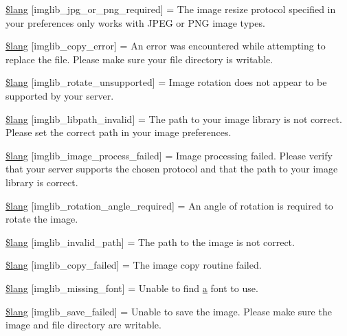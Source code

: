 \begin{DoxyCompactItemize}
\item 
\hyperlink{imglib__lang_8php_a2878e2b878871cd8010970f865d70e71}{\$lang} \mbox{[}\textquotesingle{}imglib\+\_\+jpg\+\_\+or\+\_\+png\+\_\+required\textquotesingle{}\mbox{]} = \textquotesingle{}The image resize protocol specified in your preferences only works with J\+P\+E\+G or P\+N\+G image types.\textquotesingle{}
\item 
\hyperlink{imglib__lang_8php_a012b6a0d2b3a8ef934e8783d2fbd6535}{\$lang} \mbox{[}\textquotesingle{}imglib\+\_\+copy\+\_\+error\textquotesingle{}\mbox{]} = \textquotesingle{}An error was encountered while attempting to replace the file. Please make sure your file directory is writable.\textquotesingle{}
\item 
\hyperlink{imglib__lang_8php_ab1c77c6b58fc5bf8e979ab4237ec87e7}{\$lang} \mbox{[}\textquotesingle{}imglib\+\_\+rotate\+\_\+unsupported\textquotesingle{}\mbox{]} = \textquotesingle{}Image rotation does not appear to be supported by your server.\textquotesingle{}
\item 
\hyperlink{imglib__lang_8php_a8f190c17a02ca89334c8bf0a04333f65}{\$lang} \mbox{[}\textquotesingle{}imglib\+\_\+libpath\+\_\+invalid\textquotesingle{}\mbox{]} = \textquotesingle{}The path to your image library is not correct. Please set the correct path in your image preferences.\textquotesingle{}
\item 
\hyperlink{imglib__lang_8php_a9ac6659eb97dd12e5c714cc9635cf22e}{\$lang} \mbox{[}\textquotesingle{}imglib\+\_\+image\+\_\+process\+\_\+failed\textquotesingle{}\mbox{]} = \textquotesingle{}Image processing failed. Please verify that your server supports the chosen protocol and that the path to your image library is correct.\textquotesingle{}
\item 
\hyperlink{imglib__lang_8php_a1110d59ea8fd0564e78068dbda3438fb}{\$lang} \mbox{[}\textquotesingle{}imglib\+\_\+rotation\+\_\+angle\+\_\+required\textquotesingle{}\mbox{]} = \textquotesingle{}An angle of rotation is required to rotate the image.\textquotesingle{}
\item 
\hyperlink{imglib__lang_8php_a8ff486c25806a4731d1ffe20431df825}{\$lang} \mbox{[}\textquotesingle{}imglib\+\_\+invalid\+\_\+path\textquotesingle{}\mbox{]} = \textquotesingle{}The path to the image is not correct.\textquotesingle{}
\item 
\hyperlink{imglib__lang_8php_a9363000d2005b8276b39d581a11b562d}{\$lang} \mbox{[}\textquotesingle{}imglib\+\_\+copy\+\_\+failed\textquotesingle{}\mbox{]} = \textquotesingle{}The image copy routine failed.\textquotesingle{}
\item 
\hyperlink{imglib__lang_8php_a935800aad2be18ca4fe99bb074674848}{\$lang} \mbox{[}\textquotesingle{}imglib\+\_\+missing\+\_\+font\textquotesingle{}\mbox{]} = \textquotesingle{}Unable to find \hyperlink{bootstrap_8min_8js_a1f5870dcf487187f13d5fd328ed9e6e7}{a} font to use.\textquotesingle{}
\item 
\hyperlink{imglib__lang_8php_a4d7a99fddc60c97a7327fa0125dea264}{\$lang} \mbox{[}\textquotesingle{}imglib\+\_\+save\+\_\+failed\textquotesingle{}\mbox{]} = \textquotesingle{}Unable to save the image. Please make sure the image and file directory are writable.\textquotesingle{}
\end{DoxyCompactItemize}
